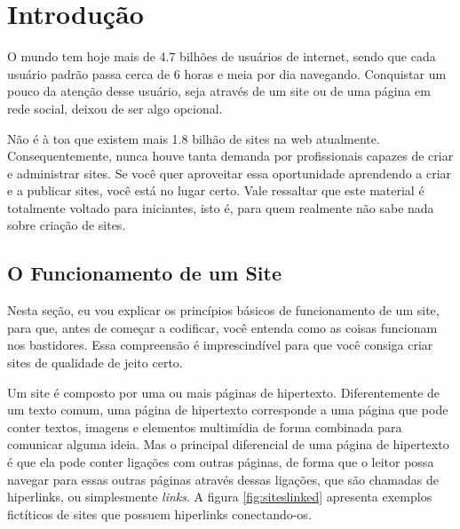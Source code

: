 
\chapter{Introdução}

O mundo tem hoje mais de 4.7 bilhões de usuários de internet, sendo que cada usuário padrão passa cerca de 6 horas e meia por dia navegando. Conquistar um pouco da atenção desse usuário, seja através de um site ou de uma página em rede social, deixou de ser algo opcional. 

Não é à toa que existem mais 1.8 bilhão de sites na web atualmente. Consequentemente, nunca houve tanta demanda por profissionais capazes de criar e administrar sites. Se você quer aproveitar essa oportunidade aprendendo a criar e a publicar sites, você está no lugar certo. Vale ressaltar que este material é totalmente voltado para iniciantes, isto é, para quem realmente não sabe nada sobre criação de sites. 

\section{O Funcionamento de um Site}

Nesta seção, eu vou explicar os princípios básicos de funcionamento de um site, para que, antes de começar a codificar, você entenda como as coisas funcionam nos bastidores. Essa compreensão é imprescindível para que você consiga criar sites de qualidade de jeito certo. 

Um site é composto por uma ou mais páginas de hipertexto. Diferentemente de um texto comum, uma página de hipertexto corresponde a uma página que pode conter textos, imagens e elementos multimídia de forma combinada para comunicar alguma ideia. Mas o principal diferencial de uma página de hipertexto é que ela pode conter ligações com outras páginas, de forma que o leitor possa navegar para essas outras páginas através dessas ligações, que são chamadas de hiperlinks, ou simplesmente \textit{links}. A figura \ref{fig:siteslinked} apresenta exemplos fictíticos de sites que possuem hiperlinks conectando-os.

